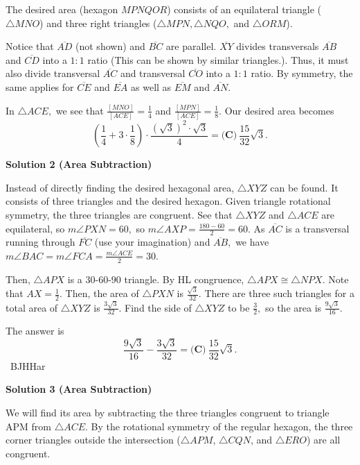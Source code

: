 \begin{enumerate}
 The desired area (hexagon $MPNQOR$) consists of an equilateral triangle ($\triangle MNO$) and three right triangles ($\triangle MPN,\triangle NQO,$ and $\triangle ORM$).

 Notice that $\overline {AD}$ (not shown) and $\overline {BC}$ are parallel. $\overline {XY}$ divides transversals $\overline {AB}$ and $\overline {CD}$ into a $1:1$ ratio (This can be shown by similar triangles.). Thus, it must also divide transversal $\overline {AC}$ and transversal $\overline {CO}$ into a $1:1$ ratio. By symmetry, the same applies for $\overline {CE}$ and $\overline {EA}$ as well as $\overline {EM}$ and $\overline {AN}.$

 In $\triangle ACE,$ we see that $\frac{[MNO]}{[ACE]} = \frac{1}{4}$ and $\frac{[MPN]}{[ACE]} = \frac{1}{8}.$ Our desired area becomes 
 \[\left(\frac{1}{4}+3 \cdot \frac{1}{8}\right) \cdot \frac{(\sqrt{3})^2 \cdot \sqrt{3}}{4} = \boxed{\textbf{(C)}\ \frac {15}{32}\sqrt{3}}.\]




\textbf{Solution 2 (Area Subtraction)}

Instead of directly finding the desired hexagonal area, $\triangle XYZ$ can be found. It consists of three triangles and the desired hexagon. Given triangle rotational symmetry, the three triangles are congruent. See that $\triangle XYZ$ and $\triangle ACE$ are equilateral, so $m\angle PXN=60,$ so $m\angle AXP = \frac{180-60}{2}=60.$ As $\overline {AC}$ is a transversal running through $\overline {FC}$ (use your imagination) and $\overline {AB},$ we have $m\angle BAC=m\angle FCA = \frac{m\angle ACE}{2}=30.$ 

 Then, $\triangle APX$ is a $30$-$60$-$90$ triangle. By HL congruence, $\triangle APX \cong \triangle NPX.$ Note that $AX=\frac{1}{2}.$ Then, the area of $\triangle PXN$ is $\frac{\sqrt{3}}{32}.$ There are three such triangles for a total area of $\triangle XYZ$ is $\frac{3\sqrt{3}}{32}.$ Find the side of $\triangle XYZ$ to be $\frac{3}{2},$ so the area is $\frac{9\sqrt{3}}{16}.$ 

 The answer is 
 \[\frac{9\sqrt{3}}{16}-\frac{3\sqrt{3}}{32}=\boxed{\textbf{(C)}\ \frac {15}{32}\sqrt{3}}.\]~BJHHar

 



\textbf{Solution 3 (Area Subtraction)}

We will find its area by subtracting the three triangles congruent to triangle APM from $\triangle ACE$. By the rotational symmetry of the regular hexagon, the three corner triangles outside the intersection ($\triangle APM$, $\triangle CQN$, and $\triangle ERO$) are all congruent. 


\end{enumerate}
